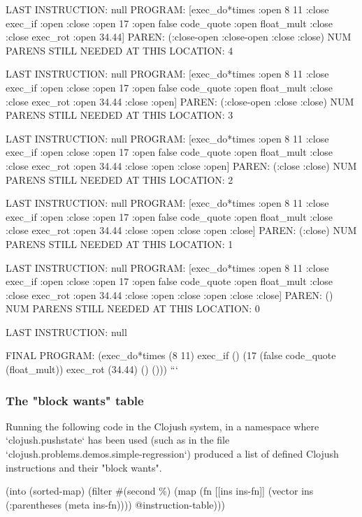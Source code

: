 LAST INSTRUCTION: null
PROGRAM: [exec\_do*times :open 8 11 :close exec\_if :open :close :open 17 :open false code\_quote :open float\_mult :close :close exec\_rot :open 34.44]
PAREN: (:close-open :close-open :close :close)
NUM PARENS STILL NEEDED AT THIS LOCATION: 4

LAST INSTRUCTION: null
PROGRAM: [exec\_do*times :open 8 11 :close exec\_if :open :close :open 17 :open false code\_quote :open float\_mult :close :close exec\_rot :open 34.44 :close :open]
PAREN: (:close-open :close :close)
NUM PARENS STILL NEEDED AT THIS LOCATION: 3

LAST INSTRUCTION: null
PROGRAM: [exec\_do*times :open 8 11 :close exec\_if :open :close :open 17 :open false code\_quote :open float\_mult :close :close exec\_rot :open 34.44 :close :open :close :open]
PAREN: (:close :close)
NUM PARENS STILL NEEDED AT THIS LOCATION: 2

LAST INSTRUCTION: null
PROGRAM: [exec\_do*times :open 8 11 :close exec\_if :open :close :open 17 :open false code\_quote :open float\_mult :close :close exec\_rot :open 34.44 :close :open :close :open :close]
PAREN: (:close)
NUM PARENS STILL NEEDED AT THIS LOCATION: 1

LAST INSTRUCTION: null
PROGRAM: [exec\_do*times :open 8 11 :close exec\_if :open :close :open 17 :open false code\_quote :open float\_mult :close :close exec\_rot :open 34.44 :close :open :close :open :close :close]
PAREN: ()
NUM PARENS STILL NEEDED AT THIS LOCATION: 0

LAST INSTRUCTION: null

FINAL PROGRAM:
(exec\_do*times
 (8 11)
 exec\_if
 ()
 (17
  (false code\_quote (float\_mult))
  exec\_rot
  (34.44)
  ()
  ()))
```

\subsubsection{ The "block wants" table}

Running the following code in the Clojush system, in a namespace where `clojush.pushstate` has been used (such as in the file `clojush.problems.demos.simple-regression`) produced a list of defined Clojush instructions and their "block wants".

    (into (sorted-map)
          (filter \#(second \%)
                  (map (fn [[ins ins-fn]]
                         (vector ins (:parentheses (meta ins-fn))))
                       @instruction-table)))




